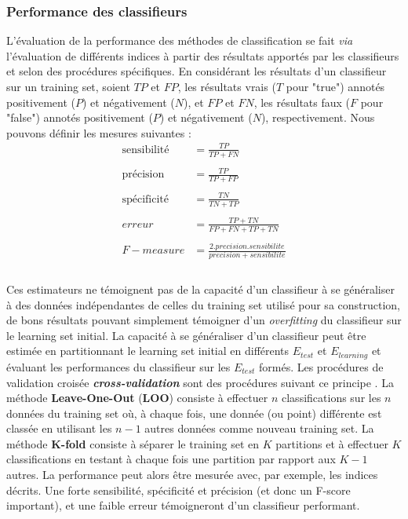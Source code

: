 \subsubsection{Performance des classifieurs}\label{parperf}\label{parclassifrobust}
L'évaluation de la performance des méthodes de classification se fait \textit{via} l'évaluation de différents indices à partir des résultats apportés par les classifieurs et selon des procédures spécifiques. En considérant les résultats d'un classifieur sur un training set, soient $TP$ et $FP$, les résultats vrais ($T$ pour "true") annotés positivement ($P$) et négativement ($N$), et $FP$ et $FN$, les résultats faux ($F$ pour "false") annotés positivement ($P$) et négativement ($N$), respectivement. Nous pouvons définir les mesures suivantes \citep{han2012data,hamel2011knowledge}:
\begin{equation}\label{eqsensitive}
\begin{split}
\textrm{sensibilité} & =\frac{TP}{TP+FN}\\
\\[-0.2cm]
\textrm{précision} & =\frac{TP}{TP+FP}\\
\\[-0.2cm]
\textrm{spécificité} & =\frac{TN}{TN+TP}\\
\\[-0.2cm]
erreur & =\frac{TP+TN}{FP+FN+TP+TN}\\
\\[-0.2cm]
F-{measure} & =\frac{2.precision.sensibilite}{precision+sensibilite}\\
\end{split}
\end{equation}
\\
Ces estimateurs ne témoignent pas de la capacité d'un classifieur à se généraliser à des données indépendantes de celles du training set utilisé pour sa construction, de bons résultats pouvant simplement témoigner d'un \textit{overfitting} du classifieur sur le learning set initial. La capacité à se généraliser d'un classifieur peut être estimée en partitionnant le learning set initial en différents $E_{test}$ et $E_{learning}$ et évaluant les performances du classifieur sur les $E_{test}$ formés. Les procédures de validation croisée \textit{\textbf{cross-validation}} sont des procédures suivant ce principe \citep{witten2013data,han2012data,hamel2011knowledge}. La méthode \textbf{Leave-One-Out} (\textbf{LOO}) consiste à effectuer $n$ classifications sur les $n$ données du training set où, à chaque fois, une donnée (ou point) différente est classée en utilisant les $n-1$ autres données comme nouveau training set. La méthode \textbf{K-fold} consiste à séparer le training set en $K$ partitions et à effectuer $K$ classifications en testant à chaque fois une partition par rapport aux $K-1$ autres. La performance peut alors être mesurée avec, par exemple, les indices décrits. Une forte sensibilité, spécificité et précision (et donc un F-score important), et une faible erreur témoigneront d'un classifieur performant.
